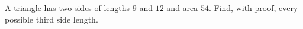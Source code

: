 A triangle has two sides of lengths $9$ and $12$ and area $54$. Find, with proof, every possible third side length.
